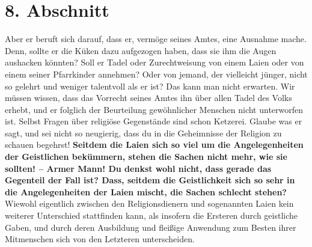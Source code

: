 \section{8. Abschnitt} \label{kap12_ab8}

Aber er beruft sich darauf, dass er, vermöge seines
Amtes, eine
Ausnahme mache.
Denn, sollte er die Küken dazu aufgezogen haben, dass sie ihm die Augen
aushacken könnten? Soll er Tadel oder Zurechtweisung von einem
Laien oder von
einem seiner Pfarrkinder annehmen? Oder von jemand, der vielleicht jünger, nicht
so gelehrt und weniger talentvoll als er ist? Das kann man nicht erwarten. Wir
müssen wissen, dass das Vorrecht seines Amtes ihn über allen Tadel des Volks
erhebt, und er folglich der Beurteilung gewöhnlicher Menschen nicht unterworfen
ist. Selbst Fragen über religiöse Gegenstände sind schon
Ketzerei. Glaube was er
sagt, und sei nicht so neugierig, dass du in die Geheimnisse der
Religion zu
schauen begehrst! \label{ref:12_08_eitle_menschen_leihen_vs_geisltichkeit}
\textbf{Seitdem die Laien sich so viel um die Angelegenheiten
der
Geistlichen bekümmern, stehen die Sachen nicht mehr, wie sie sollten! -- Armer
Mann! Du denkst wohl nicht, dass gerade das Gegenteil der Fall ist? Dass,
seitdem
die Geistlichkeit sich so sehr in die Angelegenheiten der Laien mischt, die
Sachen schlecht stehen?} Wiewohl eigentlich zwischen den Religionsdienern und
sogenannten Laien kein weiterer Unterschied stattfinden kann, als insofern
die Ersteren durch geistliche Gaben, und durch deren Ausbildung und fleißige
Anwendung zum Besten ihrer Mitmenschen sich von den Letzteren unterscheiden.


